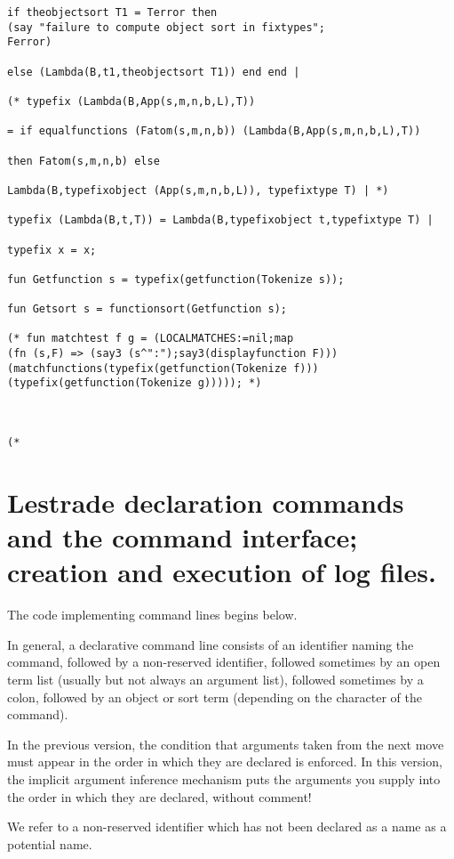 \documentclass[12pt]{article}
\begin{document}
\begin{verbatim}
if theobjectsort T1 = Terror then 
(say "failure to compute object sort in fixtypes";
Ferror)

else (Lambda(B,t1,theobjectsort T1)) end end |

(* typefix (Lambda(B,App(s,m,n,b,L),T))

= if equalfunctions (Fatom(s,m,n,b)) (Lambda(B,App(s,m,n,b,L),T)) 

then Fatom(s,m,n,b) else 

Lambda(B,typefixobject (App(s,m,n,b,L)), typefixtype T) | *)

typefix (Lambda(B,t,T)) = Lambda(B,typefixobject t,typefixtype T) |

typefix x = x;

fun Getfunction s = typefix(getfunction(Tokenize s));

fun Getsort s = functionsort(Getfunction s);

(* fun matchtest f g = (LOCALMATCHES:=nil;map
(fn (s,F) => (say3 (s^":");say3(displayfunction F)))
(matchfunctions(typefix(getfunction(Tokenize f))) 
(typefix(getfunction(Tokenize g))))); *)



(*

\end{verbatim}

\newpage

\section{Lestrade declaration commands and the command interface; creation and execution of log files.}

The code implementing command lines begins below.

In general, a declarative command line consists of an identifier naming the command, followed by a non-reserved identifier, followed sometimes by an open term list (usually but not always an argument list), followed sometimes by a colon, followed by an object or sort term (depending on the character of the command).

In the previous version, the condition that arguments taken from the next move must appear in the order in which they are declared is enforced.
In this version, the implicit argument inference mechanism puts the arguments you supply into the order in which they are declared, without comment!

We refer to a non-reserved identifier which has not been declared as a name as a potential name.
\end{document}
